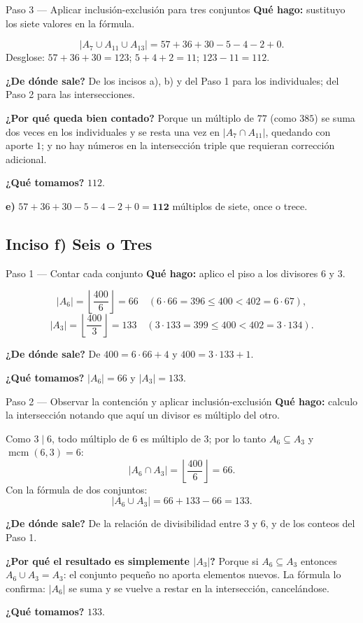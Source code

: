 \documentclass[11pt]{article}
\begin{document}
\begin{paso}{Paso 3 --- Aplicar inclusión-exclusión para tres conjuntos}
\textbf{Qué hago:} sustituyo los siete valores en la fórmula.

\[
|A_7\cup A_{11}\cup A_{13}| = 57+36+30 - 5 - 4 - 2 + 0 .
\]
Desglose: $57+36+30 = 123$; $5+4+2 = 11$; $123-11 = 112$.

\textbf{¿De dónde sale?} De los incisos a), b) y del Paso 1 para los individuales; del Paso 2 para las intersecciones.

\textbf{¿Por qué queda bien contado?} Porque un múltiplo de $77$ (como $385$) se suma dos veces en los individuales y se resta una vez en $|A_7\cap A_{11}|$, quedando con aporte $1$; y no hay números en la intersección triple que requieran corrección adicional.

\textbf{¿Qué tomamos?} $112$.
\end{paso}

\begin{resp}
\textbf{e)} $57+36+30-5-4-2+0 = \mathbf{112}$ múltiplos de siete, once o trece.
\end{resp}

\subsection*{Inciso f) Seis o Tres}

\begin{paso}{Paso 1 --- Contar cada conjunto}
\textbf{Qué hago:} aplico el piso a los divisores $6$ y $3$.

\[
|A_6| = \left\lfloor \frac{400}{6}\right\rfloor = 66 \quad (6\cdot 66 = 396\le 400 < 402 = 6\cdot 67),
\]
\[
|A_3| = \left\lfloor \frac{400}{3}\right\rfloor = 133 \quad (3\cdot 133 = 399\le 400 < 402 = 3\cdot 134).
\]

\textbf{¿De dónde sale?} De $400 = 6\cdot 66+4$ y $400 = 3\cdot 133+1$.

\textbf{¿Qué tomamos?} $|A_6| = 66$ y $|A_3|=133$.
\end{paso}

\begin{paso}{Paso 2 --- Observar la contención y aplicar inclusión-exclusión}
\textbf{Qué hago:} calculo la intersección notando que aquí un divisor es múltiplo del otro.

Como $3\mid 6$, todo múltiplo de $6$ es múltiplo de $3$; por lo tanto $A_6\subseteq A_3$ y $\operatorname{mcm}(6,3)=6$:
\[
|A_6\cap A_3| = \left\lfloor \frac{400}{6}\right\rfloor = 66 .
\]
Con la fórmula de dos conjuntos:
\[
|A_6\cup A_3| = 66+133-66 = 133 .
\]

\textbf{¿De dónde sale?} De la relación de divisibilidad entre $3$ y $6$, y de los conteos del Paso 1.

\textbf{¿Por qué el resultado es simplemente $|A_3|$?} Porque si $A_6\subseteq A_3$ entonces $A_6\cup A_3 = A_3$: el conjunto pequeño no aporta elementos nuevos. La fórmula lo confirma: $|A_6|$ se suma y se vuelve a restar en la intersección, cancelándose.

\textbf{¿Qué tomamos?} $133$.
\end{paso}
\end{document}
